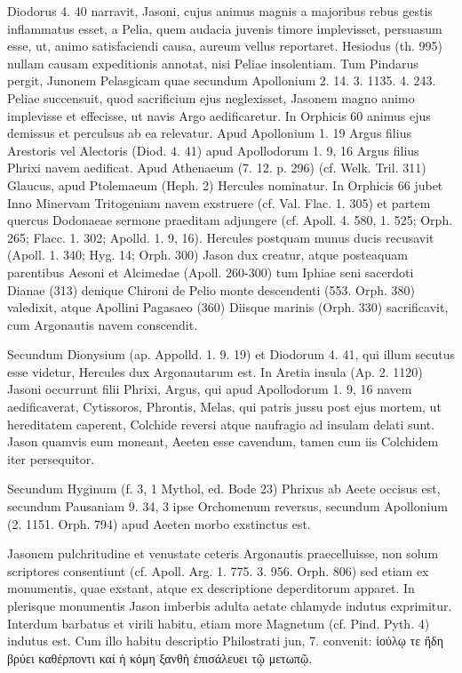 \documentclass[a4paper, 11pt, oneside, polutonikogreek, german]{article}
\begin{document}
Diodorus 4. 40 narravit, Jasoni, cujus animus magnis a majoribus rebus gestis inflammatus esset, a Pelia, quem audacia juvenis timore implevisset, persuasum esse, ut, animo satisfaciendi causa, aureum vellus reportaret. Hesiodus (th. 995) nullam causam expeditionis annotat, nisi Peliae insolentiam. Tum Pindarus pergit, Junonem Pelasgicam quae secundum Apollonium 2. 14. 3. 1135. 4. 243. Peliae succensuit, quod sacrificium ejus neglexisset, Jasonem magno animo implevisse et effecisse, ut navis Argo aedificaretur. In Orphicis 60 animus ejus demissus et perculsus ab ea relevatur. Apud Apollonium 1. 19 Argus filius Arestoris vel Alectoris (Diod. 4. 41) apud Apollodorum 1. 9, 16 Argus filius Phrixi navem aedificat. Apud Athenaeum (7. 12. p. 296) (cf. Welk. Tril. 311) Glaucus, apud Ptolemaeum (Heph. 2) Hercules nominatur. In Orphicis 66 jubet Inno Minervam Tritogeniam navem exstruere (cf. Val. Flac. 1. 305) et partem quercus Dodonaeae sermone praeditam adjungere (cf. Apoll. 4. 580, 1. 525; Orph. 265; Flacc. 1. 302; Apolld. 1. 9, 16). Hercules postquam munus ducis recusavit (Apoll. 1. 340; Hyg. 14; Orph. 300) Jason dux creatur, atque posteaquam parentibus Aesoni et Alcimedae (Apoll. 260-300) tum Iphiae seni sacerdoti Dianae (313) denique Chironi de Pelio monte descendenti (553. Orph. 380) valedixit, atque Apollini Pagasaeo (360) Diisque marinis (Orph. 330) sacrificavit, cum Argonautis navem conscendit.

Secundum Dionysium (ap. Appolld. 1. 9. 19) et Diodorum 4. 41, qui illum secutus esse videtur, Hercules dux Argonautarum est. In Aretia insula (Ap. 2. 1120) Jasoni occurrunt filii Phrixi, Argus, qui apud Apollodorum 1. 9, 16 navem aedificaverat, Cytissoros, Phrontis, Melas, qui patris jussu post ejus mortem, ut hereditatem caperent, Colchide reversi atque naufragio ad insulam delati sunt. Jason quamvis eum moneant, Aeeten esse cavendum, tamen cum iis Colchidem iter persequitor.

Secundum Hyginum (f. 3, 1 Mythol, ed. Bode 23) Phrixus ab Aeete occisus est, secundum Pausaniam 9. 34, 3 ipse Orchomenum reversus, secundum Apollonium (2. 1151. Orph. 794) apud Aeeten morbo exstinctus est.

Jasonem pulchritudine et venustate ceteris Argonautis praecelluisse, non solum scriptores consentiunt (cf. Apoll. Arg. 1. 775. 3. 956. Orph. 806) sed etiam ex monumentis, quae exstant, atque ex descriptione deperditorum apparet. In plerisque monumentis Jason imberbis adulta aetate chlamyde indutus exprimitur. Interdum barbatus et virili habitu, etiam more Magnetum (cf. Pind. Pyth. 4) indutus est. Cum illo habitu descriptio Philostrati jun, 7. convenit: ἰούλῳ τε ἤδη βρύει καθέρποντι καί ἡ κόμη ξανθὴ ἐπισάλευει τῷ μετωπῷ.
\end{document}
